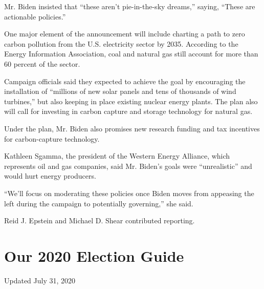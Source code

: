 Mr. Biden insisted that ``these aren't pie-in-the-sky dreams,'' saying,
``These are actionable policies.''

One major element of the announcement will include charting a path to
zero carbon pollution from the U.S. electricity sector by 2035.
According to the Energy Information Association, coal and natural gas
still account for more than 60 percent of the sector.

Campaign officials said they expected to achieve the goal by encouraging
the installation of ``millions of new solar panels and tens of thousands
of wind turbines,'' but also keeping in place existing nuclear energy
plants. The plan also will call for investing in carbon capture and
storage technology for natural gas.

Under the plan, Mr. Biden also promises new research funding and tax
incentives for carbon-capture technology.

Kathleen Sgamma, the president of the Western Energy Alliance, which
represents oil and gas companies, said Mr. Biden's goals were
``unrealistic'' and would hurt energy producers.

``We'll focus on moderating these policies once Biden moves from
appeasing the left during the campaign to potentially governing,'' she
said.

Reid J. Epstein and Michael D. Shear contributed reporting.

\hypertarget{our-2020-election-guide}{%
\section{Our 2020 Election Guide}\label{our-2020-election-guide}}

Updated July 31, 2020

